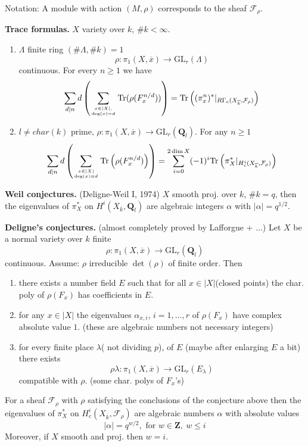 \noindent
Notation: A module with action $(M, \rho)$ corresponds to the sheaf
$\mathcal{F}_\rho$.

\medskip\noindent
{\bf Trace formulas.} $X$ variety over $k$, $\# k < \infty$.
\begin{enumerate}
\item $\Lambda$ finite ring $(\# \Lambda, \# k)=1$
$$
\rho : \pi_1(X, \overline{x})\to \text{GL}_r(\Lambda)
$$
continuous. For every $n\geq 1$ we have
$$
\sum_{d|n}d\left(
\sum_{x\in |X|, \atop \deg(x)=d}
\text{Tr}(\rho(F_x^{n/d}))\right) =
\text{Tr}\left(
(\pi_x^n)^* |_{R\Gamma_c(X_{\overline{k}}, \mathcal{F}_\rho)}\right)
$$
\item $l\neq char(k)$ prime, $\rho : \pi_1(X, \overline{x})\to
\text{GL}_r(\mathbf{Q}_l)$. For any $n\geq 1$
$$
\sum_{d|n} d\left(
\sum_{x\in |X| \atop \deg(x)=d}
\text{Tr}
\left(
\rho(F_x^{n/d})
\right)
\right) =
\sum_{i = 0}^{2\dim X}
(-1)^i
\text{Tr}\left(
\pi_X^* |_{H_c^i(X_{\overline{k}}, \mathcal{F}_\rho)}\right)
$$
\end{enumerate}

\noindent
{\bf Weil conjectures.} (Deligne-Weil I, 1974) $X$ smooth proj. over $k$,
$\# k = q$, then the eigenvalues of $\pi_X^*$ on $H^i(X_{\overline{k}},
\mathbf{Q}_l)$ are algebraic integers $\alpha$ with $|\alpha|=q^{1/2}$.

\medskip\noindent
{\bf Deligne's conjectures.} (almost completely proved by
Lafforgue + $\ldots$) Let $X$ be a normal variety over $k$ finite
$$
\rho : \pi_1(X, \overline{x}) \longrightarrow \text{GL}_r(\mathbf{Q}_l)
$$
continuous. Assume: $\rho$ irreducible $\det(\rho)$ of finite order. Then
\begin{enumerate}
\item there exists a number field $E$ such that for all $x\in
|X|$(closed points) the char. poly of $\rho(F_x)$ has coefficients in $E$.
\item for any $x\in |X|$ the eigenvalues $\alpha_{x, i}$, $i = 1, \ldots,
r$ of $\rho(F_x)$ have complex absolute value $1$.
(these are algebraic numbers not necessary integers)
\item for every finite place $\lambda$( not dividing $p$), of $E$
(maybe after enlarging $E$ a bit) there exists
$$
\rho\lambda : \pi_1(X, \overline{x}) \to \text{GL}_r(E_\lambda)
$$
compatible with $\rho$. (some char. polys of $F_x$'s)
\end{enumerate}

\begin{theorem}
\label{theorem-weil-II}
For a sheaf
$\mathcal{F}_\rho$ with $\rho$ satisfying the conclusions of the conjecture
above then the eigenvalues of $\pi_X^*$ on $H_c^i(X_{\overline{k}},
\mathcal{F}_{\rho})$ are algebraic numbers $\alpha$ with absolute values
$$
|\alpha|=q^{w/2}, \text{ for }w\in \mathbf{Z},\ w\leq i
$$
Moreover, if $X$ smooth and proj. then $w = i$.
\end{theorem}

